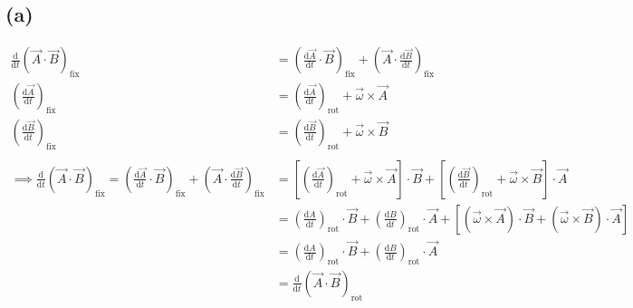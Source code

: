 \documentclass[letter, 10pts]{article}
\begin{document}
\subsection*{(a)}
\begin{align*}
\frac{\mathrm{d} }{\mathrm{d} t} \left(\vec{A} \cdot  \vec{B}\right)_\text{fix} &= 
\left(
\frac{\mathrm{d} \vec{A}}{\mathrm{d} t} \cdot \vec{B}
\right)_\text{fix} + 
\left(
\vec{A} \cdot  \frac{\mathrm{d} \vec{B}}{\mathrm{d} t}
\right)_\text{fix}
\\
\left(
\frac{\mathrm{d} \vec{A}}{\mathrm{d} t} \right)_\text{fix} 
&= 
\left(\frac{\mathrm{d} \vec{A}}{\mathrm{d} t}\right)_\text{rot}+ \vec{\omega} \times \vec{A} \\
\left(
\frac{\mathrm{d} \vec{B}}{\mathrm{d} t} \right)_\text{fix} 
&= 
\left(\frac{\mathrm{d} \vec{B}}{\mathrm{d} t}\right)_\text{rot}+ \vec{\omega} \times \vec{B} \\ 
\\\implies
\frac{\mathrm{d} }{\mathrm{d} t} \left(\vec{A} \cdot  \vec{B}\right)_\text{fix} = 
\left(
\frac{\mathrm{d} \vec{A}}{\mathrm{d} t} \cdot \vec{B}
\right)_\text{fix} + 
\left(
\vec{A} \cdot  \frac{\mathrm{d} \vec{B}}{\mathrm{d} t}
\right)_\text{fix} 
&= \left[
\left(\frac{\mathrm{d} \vec{A}}{\mathrm{d} t}\right)_\text{rot}+ \vec{\omega} \times \vec{A}
\right]\cdot \vec{B}
+\left[
\left(\frac{\mathrm{d} \vec{B}}{\mathrm{d} t}\right)_\text{rot}+ \vec{\omega} \times \vec{B}
\right]\cdot \vec{A}\\
&= 
\left(\frac{\mathrm{d} A}{\mathrm{d} t}\right)_\text{rot} \cdot \vec{B} + 
\left(\frac{\mathrm{d} B}{\mathrm{d} t}\right)_\text{rot} \cdot \vec{A} + 
\left[
	(\vec{\omega} \times \vec{A}) \cdot \vec{B} + (\vec{\omega} \times \vec{B}) \cdot \vec{A}
\right] \tag{check appendix for why third term is zero}
\\
&= 
\left(\frac{\mathrm{d} A}{\mathrm{d} t}\right)_\text{rot} \cdot \vec{B} + 
\left(\frac{\mathrm{d} B}{\mathrm{d} t}\right)_\text{rot} \cdot \vec{A} 
\\
&= 
\frac{\mathrm{d} }{\mathrm{d} t} 
\left(
\vec{A} \cdot \vec{B}\right)_\text{rot}\\
\end{align*}
\end{document}
